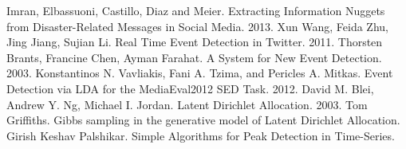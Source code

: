 \documentclass[12pt, a4paper]{article}
\begin{document}
\begin{thebibliography}{9}
	Imran, Elbassuoni, Castillo, Diaz and Meier.
	Extracting Information Nuggets from Disaster-Related Messages in Social Media.
	2013.
	Xun Wang, Feida Zhu, Jing Jiang, Sujian Li.
	Real Time Event Detection in Twitter.
	2011.
	Thorsten Brants, Francine Chen, Ayman Farahat.
	A System for New Event Detection.
	2003.
	Konstantinos N. Vavliakis, Fani A. Tzima, and Pericles A. Mitkas.	
	Event Detection via LDA for the MediaEval2012 SED Task.
	2012.
	David M. Blei, Andrew Y. Ng, Michael I. Jordan.
	Latent Dirichlet Allocation.
	2003.
	Tom Griffiths.
	Gibbs sampling in the generative model of Latent Dirichlet Allocation.
	Girish Keshav Palshikar.
	Simple Algorithms for Peak Detection in Time-Series.
	
\end{thebibliography}
  
\end{document}
